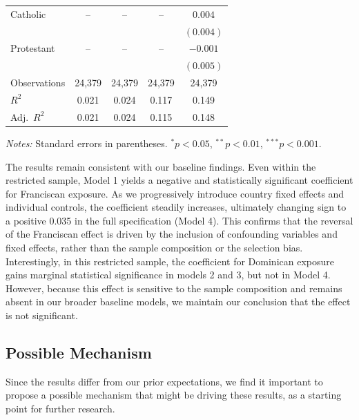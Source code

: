 \documentclass[12pt, a4paper]{article}
\begin{document}
\begin{table}[ht]
\begin{tabular}{lcccc}
Catholic 
& -- & -- & -- 
& $0.004$ \\
&  &  &  & $(0.004)$ \\
\addlinespace[0.2em]

Protestant 
& -- & -- & -- 
& $-0.001$ \\
&  &  &  & $(0.005)$ \\

\midrule

Observations 
& 24,379 & 24,379 & 24,379 & 24,379 \\

$R^2$ 
& 0.021 & 0.024 & 0.117 & 0.149 \\

Adj.\ $R^2$ 
& 0.021 & 0.024 & 0.115 & 0.148 \\
\bottomrule
\end{tabular}

\vspace{0.2em}
\scriptsize
\textit{Notes:} Standard errors in parentheses. 
$^{*}p<0.05$, $^{**}p<0.01$, $^{***}p<0.001$.
\end{table}

\pagebreak

The results remain consistent with our baseline findings. Even within the restricted sample, Model 1
yields a negative and statistically significant coefficient for Franciscan exposure. As we progressively introduce country 
fixed effects and individual controls, the coefficient steadily increases, ultimately changing sign to a positive 0.035 in the full 
specification (Model 4). This confirms that the reversal of the Franciscan effect is driven by the inclusion of confounding 
variables and fixed effects, rather than the sample composition or the selection bias. Interestingly, in this restricted sample, 
the coefficient for Dominican exposure gains marginal statistical significance in models 2 and 3, but not in Model 4. 
However, because this effect is sensitive to the sample composition and remains absent in our broader baseline models, 
we maintain our conclusion that the effect is not significant.

\subsection{Possible Mechanism}

Since the results differ from our prior expectations, we find it important
to propose a possible mechanism that might be driving these results, as a starting point for further research.
\end{document}

